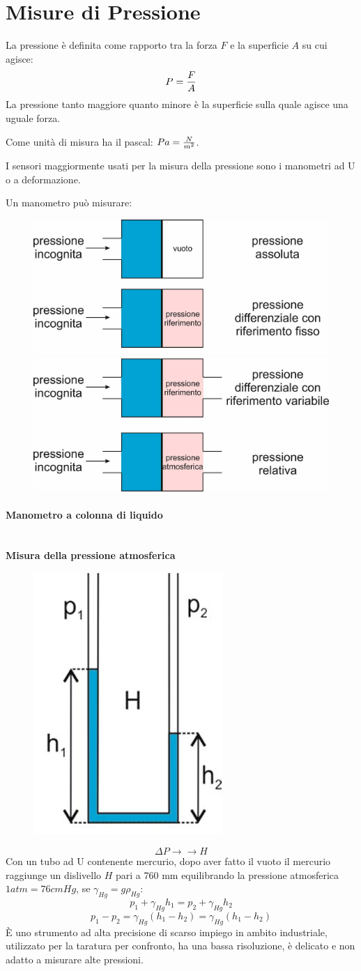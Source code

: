 \documentclass[a4paper, 15pt]{article}
\begin{document}
\section{Misure di Pressione}		
\begin{adjustwidth}{2in}{}	
  		La pressione è definita come rapporto tra la forza $ F $ e la superficie $ A $ su cui agisce:
  		\[P={F\over A}\]
  		La pressione tanto maggiore quanto minore è la superficie sulla quale agisce una uguale forza. \newline 
  		
  		Come unità di misura ha il pascal: $Pa = {N\over m^2}$. \newline
  		
  		I sensori maggiormente usati per la misura della pressione sono i manometri ad U o a deformazione. \newline 
  		
  		Un manometro può misurare:  		
  		\begin{figure}[H]
  			\centering
  			\includegraphics[width=0.3\linewidth]{immagini/p1}
  			\includegraphics[width=0.3\linewidth]{immagini/p2}
  			\label{fig:p}
  		\end{figure}
  		
\paragraph{Manometro a colonna di liquido}\mbox{} \\
\textbf{Misura della pressione atmosferica} 
		\begin{figure}[H]
			\centering
			\includegraphics[width=0.2\linewidth]{immagini/p3}
			\label{fig:p3}
		\end{figure}		
  		\[\Delta P \rightarrow \boxed{}\rightarrow H\]
  		Con un tubo ad U contenente mercurio, dopo aver fatto il vuoto il mercurio raggiunge un dislivello $H$ pari a 760 mm equilibrando la pressione atmosferica $1 atm = 76 cmHg$, se $ \gamma_{Hg} = g\rho_{Hg} $:
  		\[p_1 +\gamma_{Hg}h_1 = p_2 +\gamma_{Hg}h_2\]
  		\[p_1-p_2 = \gamma_{Hg}(h_1-h_2) = \gamma_{Hg}(h_1-h_2) \]
  		È uno strumento ad alta precisione di scarso impiego in ambito industriale, utilizzato per la taratura per confronto, ha una bassa risoluzione, è delicato e non adatto a misurare alte pressioni. \newline 
  		

\end{adjustwidth}
\end{document}

